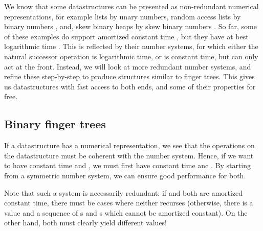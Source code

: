 We know that some datastructures can be presented as non-redundant numerical representations, for example lists by unary numbers, random access lists by binary numbers \cite{calcdata}, and, skew binary heaps by skew binary numbers \cite{progorn}. So far, some of these examples do support amortized constant time , but they have at best logarithmic time . This is reflected by their number systems, for which either the natural successor operation is logarithmic time, or is constant time, but can only act at the front. Instead, we will look at more redundant number systems, and refine these step-by-step to produce structures similar to finger trees. This gives us datastructures with fast access to both ends, and some of their properties for free.

\subsection{Binary finger trees}
If a datastructure has a numerical representation, we see that the operations on the datastructure must be coherent with the number system. Hence, if we want to have constant time  and , we must first have constant time  anc . By starting from a symmetric number system, we can ensure good performance for both.

Note that such a system is necessarily redundant: if  and  both are amortized constant time, there must be cases where neither recurses (otherwise, there is a value and a sequence of s and s which cannot be amortized constant). On the other hand, both must clearly yield different values!

